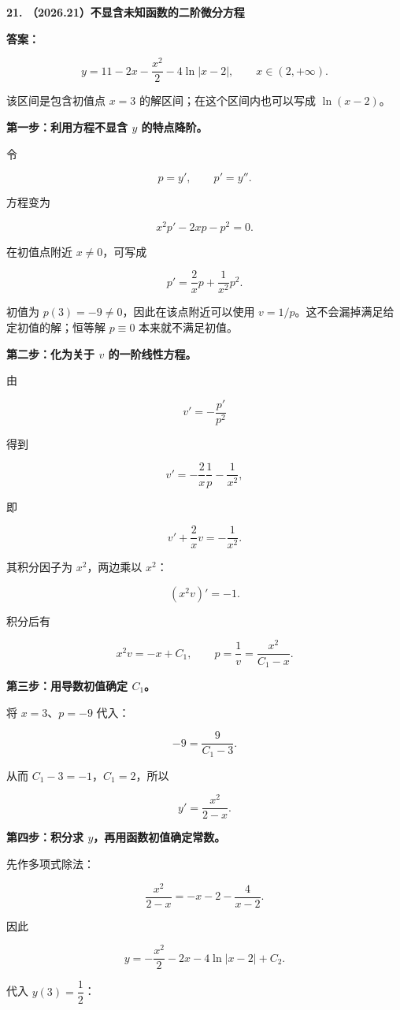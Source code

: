 \documentclass[UTF8,11pt,fontset=windows]{ctexart}
\begin{document}
\textbf{21. （2026.21）不显含未知函数的二阶微分方程}

\textbf{答案：}

$$
\boxed{y=11-2x-\frac{x^2}{2}-4\ln|x-2|},\qquad x\in(2,+\infty).
$$

该区间是包含初值点 $x=3$ 的解区间；在这个区间内也可以写成 $\ln(x-2)$。

\textbf{第一步：利用方程不显含 $y$ 的特点降阶。}

令

$$
p=y',\qquad p'=y''.
$$

方程变为

$$
x^2p'-2xp-p^2=0.
$$

在初值点附近 $x\ne0$，可写成

$$
p'=\frac2x p+\frac1{x^2}p^2.
$$

初值为 $p(3)=-9\ne0$，因此在该点附近可以使用 $v=1/p$。这不会漏掉满足给定初值的解；恒等解 $p\equiv0$ 本来就不满足初值。

\textbf{第二步：化为关于 $v$ 的一阶线性方程。}

由

$$
v'=-\frac{p'}{p^2}
$$

得到

$$
v'=-\frac2x\frac1p-\frac1{x^2},
$$

即

$$
v'+\frac2xv=-\frac1{x^2}.
$$

其积分因子为 $x^2$，两边乘以 $x^2$：

$$
(x^2v)'=-1.
$$

积分后有

$$
x^2v=-x+C_1,
\qquad
p=\frac1v=\frac{x^2}{C_1-x}.
$$

\textbf{第三步：用导数初值确定 $C_1$。}

将 $x=3$、$p=-9$ 代入：

$$
-9=\frac9{C_1-3}.
$$

从而 $C_1-3=-1$，$C_1=2$，所以

$$
y'=\frac{x^2}{2-x}.
$$

\textbf{第四步：积分求 $y$，再用函数初值确定常数。}

先作多项式除法：

$$
\frac{x^2}{2-x}=-x-2-\frac4{x-2}.
$$

因此

$$
y=-\frac{x^2}{2}-2x-4\ln|x-2|+C_2.
$$

代入 $y(3)=\dfrac12$：
\end{document}
